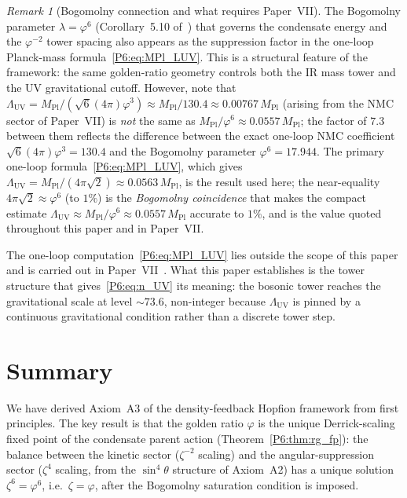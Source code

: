 \documentclass[11pt,a4paper]{article}
\theoremstyle{definition}
\theoremstyle{remark}
\newtheorem{remark}[theorem]{Remark}
\newcommand{\vp}{\varphi}
\newcommand{\lam}{\lambda}
\newcommand{\LUV}{\Lambda_{\mathrm{UV}}}
\newcommand{\MPl}{M_{\mathrm{Pl}}}
\begin{document}
\begin{remark}[Bogomolny connection and what requires Paper~VII]
The Bogomolny parameter $\lam=\vp^6$ (Corollary~5.10 of~\cite{Paper1}) that governs the condensate energy
and the $\vp^{-2}$ tower spacing also appears as the suppression factor
in the one-loop Planck-mass formula~\eqref{P6:eq:MPl_LUV}.
This is a structural feature of the framework: the same golden-ratio
geometry controls both the IR mass tower and the UV gravitational cutoff.
However, note that $\LUV = \MPl/(\sqrt{6}(4\pi)\vp^3) \approx \MPl/130.4 \approx 0.00767\,\MPl$
(arising from the NMC sector of Paper~VII) is \emph{not} the same as
$\MPl/\vp^6 \approx 0.0557\,\MPl$; the factor of $7.3$ between them
reflects the difference between the exact one-loop NMC coefficient
$\sqrt{6}(4\pi)\vp^3 = 130.4$ and the Bogomolny parameter
$\vp^6 = 17.944$.
The primary one-loop formula~\eqref{P6:eq:MPl_LUV}, which gives
$\LUV = \MPl/(4\pi\sqrt{2}) \approx 0.0563\,\MPl$, is the result used here;
the near-equality $4\pi\sqrt{2} \approx \vp^6$ (to $1\%$) is the
\emph{Bogomolny coincidence} that makes the compact estimate
$\LUV\approx\MPl/\vp^6\approx0.0557\,\MPl$ accurate to $1\%$,
and is the value quoted throughout this paper and in Paper~VII.

The one-loop computation~\eqref{P6:eq:MPl_LUV} lies outside the scope of
this paper and is carried out in Paper~VII~\cite{Paper7}.  What this
paper establishes is the tower structure that gives~\eqref{P6:eq:n_UV}
its meaning: the bosonic tower reaches the gravitational scale at
level $\sim73.6$, non-integer because $\LUV$ is pinned by a
continuous gravitational condition rather than a discrete tower step.
\end{remark}

\section{Summary}
\label{P6:sec:summary}

We have derived Axiom~A3 of the density-feedback Hopfion framework from
first principles.
The key result is that the golden ratio $\vp$ is the unique
Derrick-scaling fixed point of the condensate parent action
(Theorem~\ref{P6:thm:rg_fp}): the balance between the kinetic sector
($\zeta^{-2}$ scaling) and the angular-suppression sector ($\zeta^4$
scaling, from the $\sin^4\!\theta$ structure of Axiom~A2) has a unique
solution $\zeta^6 = \vp^6$, i.e.\ $\zeta = \vp$, after the Bogomolny
saturation condition is imposed.
\end{document}
